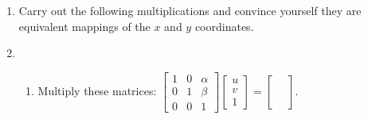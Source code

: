 \documentclass[../textbook.tex]{subfiles}
\begin{document}
\begin{enumerate}
\setcounter{enumi}{\value{mp_problem_i}}
\item Carry out the following multiplications and convince yourself they are equivalent mappings of the $x$ and $y$ coordinates.
\begin{enumerate}
\end{enumerate}
\item \begin{enumerate}
\item Multiply these matrices: $\left[\begin{array}{ccc} 1 & 0 & \alpha \\ 0 & 1 & \beta \\ 0 & 0 & 1 \end{array}\right]\left[\begin{array}{c}u \\ v \\ 1 \end{array}\right]=\left[\begin{array}{c}\phantom{u} \\ \phantom{v} \\ \phantom{1}\end{array}\right].$ \label{prob:translation_matrix}

\end{enumerate}
\end{enumerate}
\end{document}
